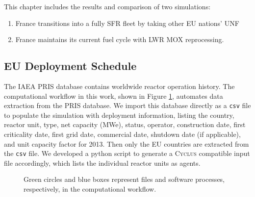 \documentclass{article}
\newcommand{\Cyclus}{\textsc{Cyclus}\xspace}%
\begin{document}
This chapter includes the results and comparison of two simulations:
\begin{enumerate}
    \item France transitions into a fully \gls{SFR} fleet by taking other \gls{EU} nations' \gls{UNF}
    \item France maintains its current fuel cycle with \gls{LWR} \gls{MOX} reprocessing.
\end{enumerate}

\subsection{\gls{EU} Deployment Schedule}

The \gls{IAEA} \gls{PRIS} database \cite{iaea_nuclear_2017} contains worldwide reactor
operation history.
The computational workflow in this work, shown in Figure \ref{diag:comp}, automates data extraction from the 
\gls{PRIS} database. We import this database directly as a \texttt{csv} file to populate the simulation
with deployment information, listing the country, reactor unit, type, net capacity (\gls{MWe}), status,
operator, construction date, first criticality date, first grid date, commercial date, shutdown
date (if applicable), and unit capacity factor for 2013. Then only the \gls{EU} countries are extracted
from the \texttt{csv} file. We developed a python script to generate
a \Cyclus 
compatible input file accordingly, which lists the individual reactor units as agents. 


\begin{figure}
        \centering
{}
\caption{Green circles and blue boxes represent files and software 
processes, respectively, in the computational workflow.}
\label{diag:comp}
\end{figure}
\end{document}
